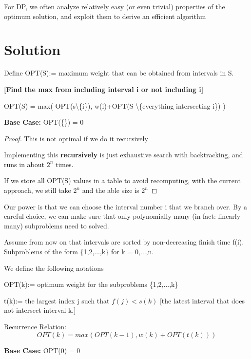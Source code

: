 \documentclass[openany]{article}
\begin{document}
\begin{theorem*}{}
    For DP, we often analyze relatively easy (or even trivial) properties of the optimum solution, and exploit them to derive an efficient algorithm
\end{theorem*}
\section*{Solution}
\begin{solution*}{}
    Define OPT(S):= maximum weight that can be obtained from intervals in S.

    \begin{center}
            \textbf{[Find the max from including interval i or not including i]}
    \end{center}
    
    OPT(S) = max( OPT(s\textbackslash \{i\}), w(i)+OPT(S \textbackslash \{everything intersecting i\}) )

    \textbf{Base Case:} OPT(\{\}) = 0

    \begin{proof}{This is not optimal if we do it recursively}
    
        Implementing this \textbf{recursively} is just exhaustive search with backtracking, and runs in about $2^n$ times.

        If we store all OPT(S) values in a table to avoid recomputing, with the current approach, we still take $2^n$ and the able size is $2^n$
    \end{proof}

    Our power is that we can choose the interval number i that we branch over. By a careful choice, we can make sure that only polynomially many (in fact: linearly many) subproblems need to solved.

    Assume from now on that intervals are sorted by non-decreasing finish time f(i). Subproblems of the form \{1,2,...,k\} for k = 0,...,n.

    We define the following notations
    
    OPT(k):= optimum weight for the subproblems \{1,2,...,k\}
    
    t(k):= the largest index j such that $f(j) < s(k)$ [the latest interval that does not intersect interval k.]
    
    Recurrence Relation:
    \[OPT(k) = max(OPT(k-1), w(k)+OPT(t(k)))\]

    \textbf{Base Case:} OPT(0) = 0
    

\end{solution*}
\end{document}
